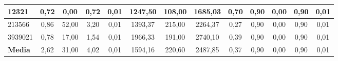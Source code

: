 \documentclass[12pt, spanish]{article}
\begin{document}
\begin{table}[H]
\begin{adjustwidth}{-1cm}{-1cm}
\begin{tabular}{|l|c|c|c|c|c|c|c|c|c|c|c|c|}
12321                                                   & 0,72                         & 0,00                           & 0,72                      & 0,01                   & 1247,50                      & 108,00                         & 1685,03                   & 0,70                   & 0,90                         & 0,00                           & 0,90                      & 0,01                   \\ \hline
213566                                                  & 0,86                         & 52,00                          & 3,20                      & 0,01                   & 1393,37                      & 215,00                         & 2264,37                   & 0,27                   & 0,90                         & 0,00                           & 0,90                      & 0,01                   \\ \hline
3939021                                                 & 0,78                         & 17,00                          & 1,54                      & 0,01                   & 1966,33                      & 191,00                         & 2740,10                   & 0,39                   & 0,90                         & 0,00                           & 0,90                      & 0,01                   \\ \hline
\textbf{Media}                                          & 2,62                         & 31,00                          & 4,02                      & 0,01                   & 1594,16                      & 220,60                         & 2487,85                   & 0,37                   & 0,90                         & 0,00                           & 0,90                      & 0,01                   \\ \hline
\end{tabular}

\end{adjustwidth}

\end{table}
\end{document}
